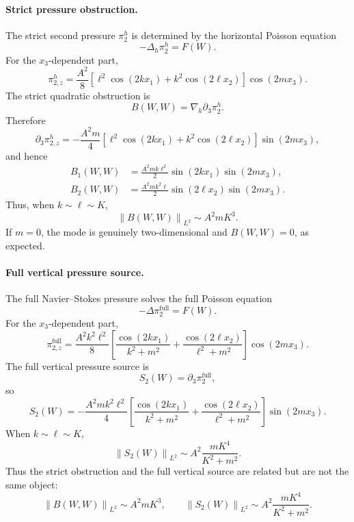 \documentclass[11pt]{article}
\numberwithin{equation}{section}
\newcommand{\norm}[2]{\left\|#1\right\|_{#2}}
\begin{document}
\paragraph{Strict pressure obstruction.}
The strict second pressure \(\pi_2^h\) is determined by the horizontal Poisson equation
\[
-\Delta_h\pi_2^h=F(W).
\]
For the \(x_3\)-dependent part,
\begin{equation}\label{eq:pi2h-fourier}
\pi_{2,z}^h
=
\frac{A^2}{8}
\left[\ell^2\cos(2kx_1)+k^2\cos(2\ell x_2)\right]
\cos(2mx_3).
\end{equation}
The strict quadratic obstruction is
\[
B(W,W)=\nabla_h\partial_3\pi_2^h.
\]
Therefore
\[
\partial_3\pi_{2,z}^h
=
-\frac{A^2m}{4}
\left[\ell^2\cos(2kx_1)+k^2\cos(2\ell x_2)\right]
\sin(2mx_3),
\]
and hence
\begin{align}
B_1(W,W)&=\frac{A^2mk\ell^2}{2}\sin(2kx_1)\sin(2mx_3),\label{eq:B1-fourier}\\
B_2(W,W)&=\frac{A^2mk^2\ell}{2}\sin(2\ell x_2)\sin(2mx_3).\label{eq:B2-fourier}
\end{align}
Thus, when \(k\sim\ell\sim K\),
\begin{equation}\label{eq:B-scaling-unscaled}
\norm{B(W,W)}{L^2}\sim A^2mK^3.
\end{equation}
If \(m=0\), the mode is genuinely two-dimensional and \(B(W,W)=0\), as expected.

\paragraph{Full vertical pressure source.}
The full Navier--Stokes pressure solves the full Poisson equation
\[
-\Delta\pi_2^{\mathrm{full}}=F(W).
\]
For the \(x_3\)-dependent part,
\begin{equation}\label{eq:full-pi2-fourier}
\pi_{2,z}^{\mathrm{full}}
=
\frac{A^2k^2\ell^2}{8}
\left[
\frac{\cos(2kx_1)}{k^2+m^2}
+
\frac{\cos(2\ell x_2)}{\ell^2+m^2}
\right]\cos(2mx_3).
\end{equation}
The full vertical pressure source is
\[
S_2(W)=\partial_3\pi_2^{\mathrm{full}},
\]
so
\begin{equation}\label{eq:S2-fourier}
S_2(W)
=
-\frac{A^2mk^2\ell^2}{4}
\left[
\frac{\cos(2kx_1)}{k^2+m^2}
+
\frac{\cos(2\ell x_2)}{\ell^2+m^2}
\right]
\sin(2mx_3).
\end{equation}
When \(k\sim\ell\sim K\),
\begin{equation}\label{eq:S2-scaling-unscaled}
\norm{S_2(W)}{L^2}
\sim
A^2\frac{mK^4}{K^2+m^2}.
\end{equation}
Thus the strict obstruction and the full vertical source are related but are not the same object:
\[
\norm{B(W,W)}{L^2}\sim A^2mK^3,
\qquad
\norm{S_2(W)}{L^2}\sim A^2\frac{mK^4}{K^2+m^2}.
\]
\end{document}
